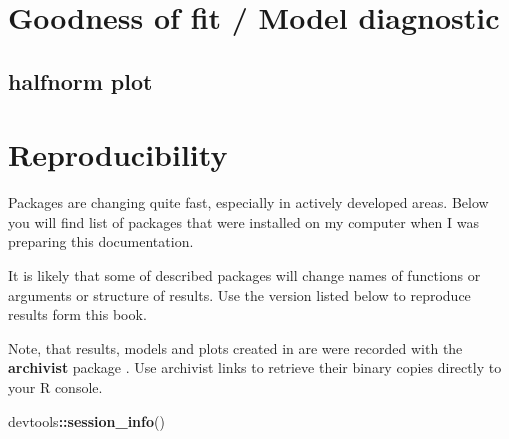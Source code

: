 \documentclass[]{book}
\newenvironment{Shaded}{\begin{snugshade}}{\end{snugshade}}
\newcommand{\KeywordTok}[1]{\textcolor[rgb]{0.13,0.29,0.53}{\textbf{#1}}}
\newcommand{\OperatorTok}[1]{\textcolor[rgb]{0.81,0.36,0.00}{\textbf{#1}}}
\newcommand{\NormalTok}[1]{#1}
\theoremstyle{definition}
\theoremstyle{definition}
\theoremstyle{definition}
\theoremstyle{remark}
\begin{document}
\chapter{Goodness of fit / Model
diagnostic}\label{goodness-of-fit-model-diagnostic}

\section{halfnorm plot}\label{halfnorm-plot}

\chapter{Reproducibility}\label{reproducibility}

Packages are changing quite fast, especially in actively developed
areas. Below you will find list of packages that were installed on my
computer when I was preparing this documentation.

It is likely that some of described packages will change names of
functions or arguments or structure of results. Use the version listed
below to reproduce results form this book.

Note, that results, models and plots created in are were recorded with
the \textbf{archivist} package \citep{archivist}. Use archivist links to
retrieve their binary copies directly to your R console.

\begin{Shaded}
\begin{Highlighting}[]
\NormalTok{devtools}\OperatorTok{::}\KeywordTok{session_info}\NormalTok{()}
\end{Highlighting}
\end{Shaded}
\end{document}
